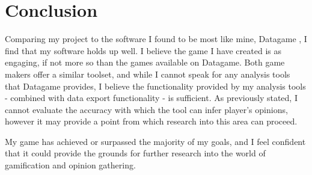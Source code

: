 \chapter{Conclusion}
Comparing my project to the software I found to be most like mine, Datagame \cite{Datagame}, I find that my software holds up well. I believe the game I have created is as engaging, if not more so than the games available on Datagame. Both game makers offer a similar toolset, and while I cannot speak for any analysis tools that Datagame provides, I believe the functionality provided by my analysis tools - combined with data export functionality - is sufficient. As previously stated, I cannot evaluate the accuracy with which the tool can infer player's opinions, however it may provide a point from which research into this area can proceed.

My game has achieved or surpassed the majority of my goals, and I feel confident that it could provide the grounds for further research into the world of gamification and opinion gathering.
